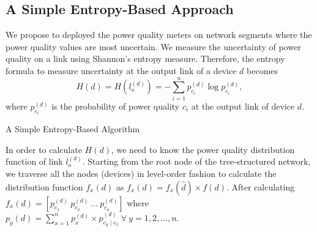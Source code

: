 \subsection{A Simple Entropy-Based Approach}
\label{sec:simpleH}
We propose to deployed the power quality meters on network segments where the power quality values are most uncertain. We measure the uncertainty of power quality on a link using Shannon's entropy measure. Therefore, the entropy formula to measure uncertainty at the output link of a device $d$ becomes
\[H(d) = H(l_{o}^{(d)}) = -\sum_{i=1}^n p_{c_i}^{(d)} \log p_{c_i}^{(d)},\]
where $p_{c_i}^{(d)}$ is the probability of power quality $c_i$ at the output link of device $d$.

\begin{algorithm}[!t]
\begin{small}
\caption{A Simple Entropy-Based Algorithm} \label{algo-1}
\end{small}
\end{algorithm}

In order to calculate $H(d)$, we need to know the power quality distribution function of link $l_{o}^{(d)}$. Starting from the root node of the tree-structured network, we traverse all the nodes (devices) in level-order fashion to calculate the distribution function $f_{x}(d)$ as $f_{x}(d) = f_x(\hat d) \times f(d)$. After calculating $f_{x}(d) = [p_{c_1}^{(d)} \ p_{c_2}^{(d)} \ \dots \ p_{c_n}^{(d)}]$ where $p_y(d) = \sum_{x=1}^n p_x^{(d)} \times p_{c_y \mid c_x}^{(d)} \ \forall \ y = 1,2,\dots,n$.


